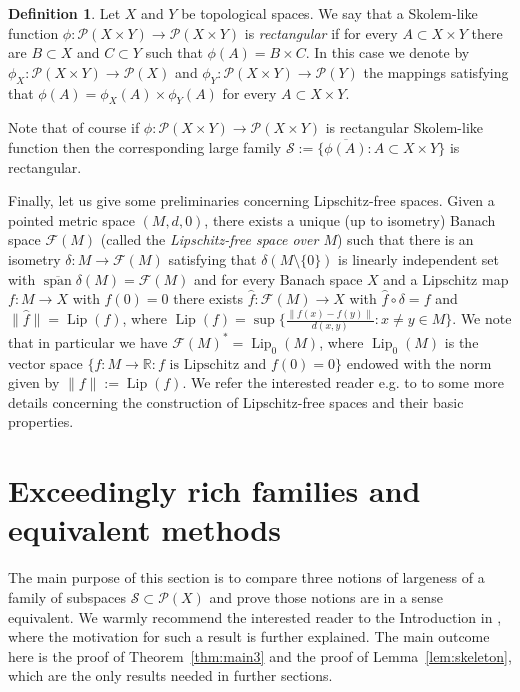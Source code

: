 \documentclass[11pt]{amsart}
\theoremstyle{definition}
\newtheorem{defin}[thm]{Definition}
\theoremstyle{remark}
\newcommand{\Rea}{\mathbb R}
\newcommand{\F}{\mathcal F}
\newcommand{\PP}{\mathcal P}
\newcommand{\SSS}{\mathcal S}
\newcommand{\closedSpan}{\overline{\operatorname{span}}}
\def \Lip {\operatorname{Lip}}
\begin{document}
\begin{defin}Let $X$ and $Y$ be topological spaces. We say that a Skolem-like function $\phi:\PP(X\times Y)\to \PP(X\times Y)$ is \emph{rectangular} if for every $A\subset X\times Y$ there are $B\subset X$ and $C\subset Y$ such that $\phi(A) = B\times C$. In this case we denote by $\phi_X:\PP(X\times Y)\to \PP(X)$ and $\phi_Y:\PP(X\times Y)\to \PP(Y)$ the mappings satisfying that $\phi(A) = \phi_X(A)\times \phi_Y(A)$ for every $A\subset X\times Y$.

Note that of course if $\phi:\PP(X\times Y)\to \PP(X\times Y)$ is rectangular Skolem-like function then the corresponding large family $\SSS:=\{\overline{\phi(A)}\colon A\subset X\times Y\}$ is rectangular.
\end{defin}

Finally, let us give some preliminaries concerning Lipschitz-free spaces. Given a pointed metric space $(M,d,0)$, there exists a unique (up to isometry) Banach space $\F(M)$ (called the \emph{Lipschitz-free space over $M$}) such that there is an isometry $\delta:M\to \F(M)$ satisfying that $\delta(M\setminus\{0\})$ is linearly independent set with $\closedSpan \delta(M) = \F(M)$ and for every Banach space $X$ and a Lipschitz map $f:M\to X$ with $f(0)=0$ there exists $\widehat{f}:\F(M)\to X$ with $\widehat{f}\circ \delta = f$ and $\|\widehat{f}\| = \Lip(f)$, where $\Lip(f) = \sup\{\frac{\|f(x)-f(y)\|}{d(x,y)}\colon x\neq y\in M\}$. We note that in particular we have $\F(M)^* = \Lip_0(M)$, where $\Lip_0(M)$ is the vector space $\{f:M\to \Rea\colon f\text{ is Lipschitz and }f(0)=0\}$ endowed with the norm given by $\|f\|:=\Lip(f)$. We refer the interested reader e.g. to \cite{CDW} to some more details concerning the construction of Lipschitz-free spaces and their basic properties.

\section{Exceedingly rich families and equivalent methods}\label{sec:formulations}

The main purpose of this section is to compare three notions of largeness of a family of subspaces $\SSS\subset\PP(X)$ and prove those notions are in a sense equivalent. We warmly recommend the interested reader to the Introduction in \cite{C18}, where the motivation for such a result is further explained. The main outcome here is the proof of Theorem~\ref{thm:main3} and the proof of Lemma~\ref{lem:skeleton}, which are the only results needed in further sections.
\end{document}
